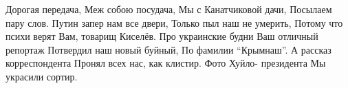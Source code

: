  
 
 
 
 

\obeycr
Дорогая передача,
Меж собою посудача,
Мы с Канатчиковой дачи,
Посылаем пару слов.
Путин запер нам все двери,
Только пыл наш не умерить,
Потому что психи верят
Вам, товарищ Киселёв.
Про украинские будни
Ваш отличный репортаж
Потвердил наш новый буйный,
По фамилии \enquote{Крымнаш}.
А рассказ корреспондента
Пронял всех нас, как клистир.
Фото Хуйло- президента
Мы украсили сортир.
\restorecr

